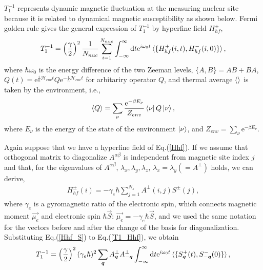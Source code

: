 \documentclass[a4,10.5pt]{report}
\begin{document}
$T^{-1}_1$ represents dynamic magnetic fluctuation at the measuring nuclear site because it is related to dynamical magnetic susceptibility as shown below.
Fermi golden rule gives the general expression of $T^{-1}_1$ by hyperfine field $H^{\pm}_{hf}$,
\begin{align}
\label{T1_Hhf}
T^{-1}_1 = \left(\frac{\gamma}{2}\right)^2\frac{1}{N_{nuc}}\sum^{N_{nuc}}_{i = 1}\int^{\infty}_{-\infty}\mathrm{d}t\mathrm{e}^{i\omega_0t}\braket{\{H^+_{hf}(i,t),H^-_{hf}(i,0)\}},
\end{align}
where $\hbar\omega_0$ is the energy difference of the two Zeeman levels, $\{A, B\} = AB + BA$,
$Q (t) = \mathrm{e}^{\frac{i}{\hbar}\mathcal{H}_{env}t}Q\mathrm{e}^{-\frac{i}{\hbar}\mathcal{H}_{env}t}$ for arbitariry operator $Q$,
and thermal average $\braket{}$ is taken by the environment, i.e.,
\begin{align}
\braket{Q} = \sum_{\nu}\frac{\mathrm{e}^{-\beta E_{\nu}}}{Z_{env}}\bra{\nu}Q\ket{\nu},
\end{align}
where $E_{\nu}$ is the energy of the state of the environment $\ket{\nu}$, and $Z_{env} = \sum_{\nu} \mathrm{e}^{-\beta E_{\nu}}$.
\begin{comment}
NMR relaxation rate $T^{-1}_1$ is propotional to thermal average of time-correlation function of spin components perpendicular 
to the applied external magnetic field.
It can be related to dynamical susceptibility through 
\end{comment}
Again suppose that we have a hyperfine field of Eq.(\ref{Hhf}).
If we assume that orthogonal matrix to diagonalize $A^{\alpha\beta}$ is independent from magnetic site index $j$ and
that, for the eigenvalues of $A^{\alpha\beta}$, $\lambda_x, \lambda_y, \lambda_z$, $\lambda_x = \lambda_y (= A^{\perp})$ holds,
we can derive,
\begin{align}
\label{Hhf_S}
H^\pm_{hf}(i) = -\gamma_e\hbar\sum^{N_s}_{j = 1}A^{\perp}(i, j)S^\pm(j),
\end{align}
where $\gamma_e$ is a gyromagnetic ratio of the electronic spin, which connects magnetic moment $\vec{\mu_e}$ and electronic spin $\hbar\vec{S}$: $\vec{\mu_e} = -\gamma_e\hbar\vec{S}$,
and we used the same notation for the vectors before and after the change of the basis for diagonalization.
Substituting Eq.(\ref{Hhf_S}) to Eq.(\ref{T1_Hhf}), we obtain
\begin{align}
\label{T1_Sq}
T^{-1}_1 = \left(\frac{\gamma}{2}\right)^2(\gamma_e\hbar)^2\sum_{\bm{q}}A^{\perp}_{\bm{q}}A^\perp_{-\bm{q}}\int^{\infty}_{-\infty}\mathrm{d}t\mathrm{e}^{i\omega_0t}
\braket{\{S^+_{\bm{q}}(t),S^-_{-\bm{q}}(0)\}},
\end{align}
\end{document}
